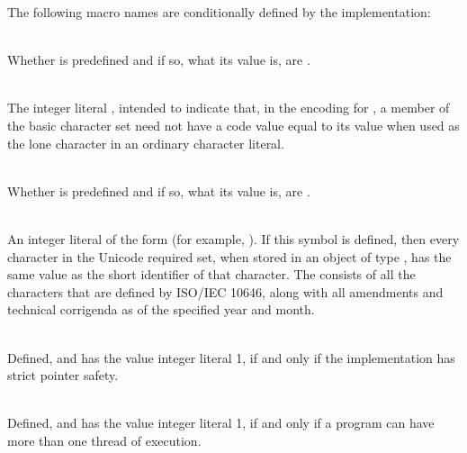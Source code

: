 \pnum
The following macro names are conditionally defined by the implementation:

\begin{description}
%
\item {}\\
Whether  is predefined and if so, what its value is,
are .

%
\item {}\\
The integer literal , intended to indicate that, in the encoding for
, a member of the basic character set need not have a code value equal to
its value when used as the lone character in an ordinary character literal.

%
\item {}\\
Whether  is predefined and if so, what its value is,
are .

%
\item {}\\
An integer literal of the form  (for example,
).
If this symbol is defined, then every character in the Unicode required set, when
stored in an object of type , has the same value as the short identifier
of that character. The  consists of all
the characters that are defined by ISO/IEC 10646, along with
all amendments and technical corrigenda as of the specified year and month.

%
\item {}\\
Defined, and has the value integer literal 1, if and only if the implementation
has strict pointer safety.

%
\item {}\\
Defined, and has the value integer literal 1, if and only if a program
can have more than one thread of execution.

\end{description}


